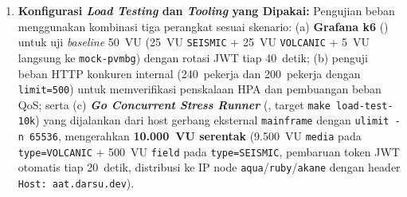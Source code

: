 \begin{enumerate}
    \item \textbf{Konfigurasi \textit{Load Testing} dan \textit{Tooling} yang Dipakai:} Pengujian beban menggunakan kombinasi tiga perangkat sesuai skenario: (a) \textbf{Grafana k6} () untuk uji \textit{baseline} 50~VU (25~VU \texttt{SEISMIC} + 25~VU \texttt{VOLCANIC} + 5~VU langsung ke \texttt{mock-pvmbg}) dengan rotasi JWT tiap 40~detik; (b) penguji beban HTTP konkuren internal (240~pekerja dan 200~pekerja dengan \texttt{limit=500}) untuk memverifikasi penskalaan HPA dan pembuangan beban QoS; serta (c) \textbf{\textit{Go Concurrent Stress Runner}} (, target \texttt{make load-test-10k}) yang dijalankan dari host gerbang eksternal \texttt{mainframe} dengan \texttt{ulimit -n 65536}, mengerahkan \textbf{10.000~VU serentak} (9.500~VU \texttt{media} pada \texttt{type=VOLCANIC} + 500~VU \texttt{field} pada \texttt{type=SEISMIC}, pembaruan token JWT otomatis tiap 20~detik, distribusi ke IP node \texttt{aqua}/\texttt{ruby}/\texttt{akane} dengan header \texttt{Host: aat.darsu.dev}).
\end{enumerate}
